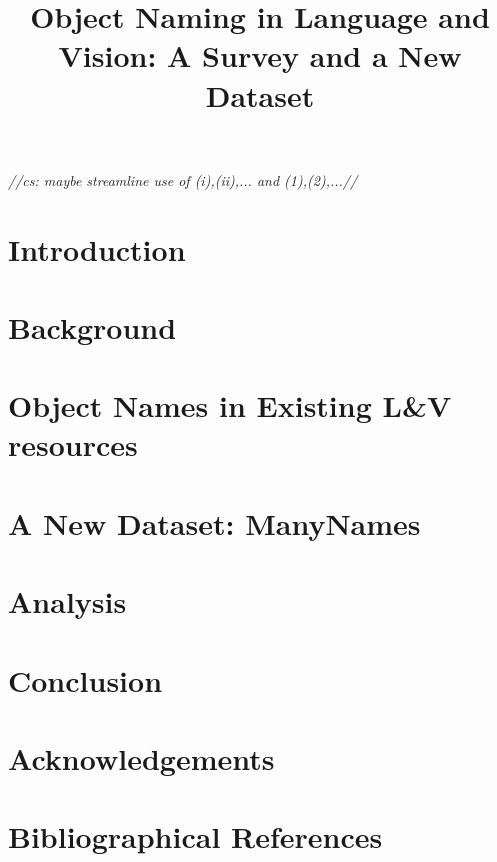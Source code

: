 \documentclass[10pt, a4paper]{article}
\title{Object Naming in Language and Vision: A Survey and a New Dataset}
\newcommand{\cs}[1]{\textcolor{green!60!black}{\emph{//cs: #1//}}}
\begin{document}
\maketitleabstract

\cs{maybe streamline use of (i),(ii),... and (1),(2),...}
\section{Introduction}


\section{Background}
\label{sec:rel-work}


\section{Object Names in Existing L\&V resources}
\label{sec:survey}


\section{A New Dataset: ManyNames}
\label{sec:data}

	
\section{Analysis}
\label{sec:analysis}


\section{Conclusion}
\label{sec:conc}


 \section{Acknowledgements}


\section{Bibliographical References}
\label{main:ref}





\end{document}

